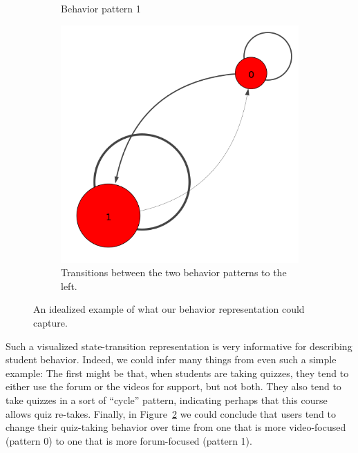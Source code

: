 \begin{figure}
\begin{subfigure}[t]{0.30\textwidth}
    \caption{Behavior pattern 1\label{fig:motivating-example-1}}
  \end{subfigure}
  \begin{subfigure}[t]{0.30\textwidth}
    \includegraphics[width=\textwidth]{figures/example/trans.png}
    \caption{Transitions between the two behavior patterns to the
    left.\label{fig:motivating-example-trans}}
  \end{subfigure}
  \caption{An idealized example of what our behavior representation could capture.}
  \label{fig:motivating-example}
\end{figure}
Such a visualized state-transition representation is very informative for
describing student behavior. Indeed, we could infer many things from even
such a simple example: The first might be that, when students are taking
quizzes, they tend to either use the forum or the videos for support, but
not both. They also tend to take quizzes in a sort of ``cycle'' pattern,
indicating perhaps that this course allows quiz re-takes. Finally, in
Figure~\ref{fig:motivating-example-trans} we could conclude that users tend
to change their quiz-taking behavior over time from one that is more
video-focused (pattern 0) to one that is more forum-focused (pattern 1).

